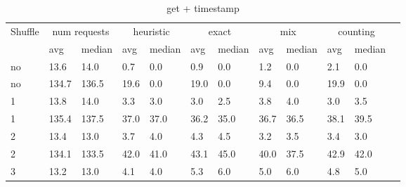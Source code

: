 \documentclass[a4paper]{report}
\begin{document}
\begin{table}[h]
	\centering
	\caption{get + timestamp}
	\label{tab:get}
	\begin{tabular}{|l|l|l|l|l|l|l|l|l|l|l|l|}
		\hline
		\multirow{2}{*}{Shuffle} & \multicolumn{2}{|c|}{num requests} & \multicolumn{2}{|c|}{heuristic} & \multicolumn{2}{|c|}{exact} & \multicolumn{2}{|c|}{mix} & \multicolumn{2}{|c|}{counting}                                          \\ \cline{2-11}
		                         & avg                                & median                          & avg                         & median                    & avg                            & median & avg  & median & avg  & median \\ \hline
		no                       & 13.6                               & 14.0                            & 0.7                         & 0.0                       & 0.9                            & 0.0    & 1.2  & 0.0    & 2.1  & 0.0    \\ \hline
		no                       & 134.7                              & 136.5                           & 19.6                        & 0.0                       & 19.0                           & 0.0    & 9.4  & 0.0    & 19.9 & 0.0    \\ \hline
		1                        & 13.8                               & 14.0                            & 3.3                         & 3.0                       & 3.0                            & 2.5    & 3.8  & 4.0    & 3.0  & 3.5    \\ \hline
		1                        & 135.4                              & 137.5                           & 37.0                        & 37.0                      & 36.2                           & 35.0   & 36.7 & 36.5   & 38.1 & 39.5   \\ \hline
		2                        & 13.4                               & 13.0                            & 3.7                         & 4.0                       & 4.3                            & 4.5    & 3.2  & 3.5    & 3.4  & 3.0    \\ \hline
		2                        & 134.1                              & 133.5                           & 42.0                        & 41.0                      & 43.1                           & 45.0   & 40.0 & 37.5   & 42.9 & 42.0   \\ \hline
		3                        & 13.2                               & 13.0                            & 4.1                         & 4.0                       & 5.3                            & 6.0    & 5.0  & 6.0    & 4.8  & 5.0    \\ \hline

\end{tabular}
\end{table}
\end{document}
